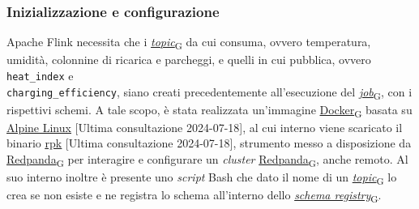 \subsubsection{Inizializzazione e configurazione}
Apache Flink necessita che i \href{https://7last.github.io/docs/pb/documentazione-interna/glossario\#topic}{\textit{topic}\textsubscript{G}} da cui consuma, ovvero temperatura, umidità, colonnine di ricarica e parcheggi, e quelli in cui pubblica, ovvero \texttt{heat\_index} e \\\texttt{charging\_efficiency},
siano creati precedentemente all'esecuzione del \href{https://7last.github.io/docs/pb/documentazione-interna/glossario\#job}{\textit{job}\textsubscript{G}}, con i rispettivi schemi. A tale scopo, è stata realizzata un'immagine \href{https://7last.github.io/docs/pb/documentazione-interna/glossario\#docker}{Docker\textsubscript{G}} basata su \href{https://hub.docker.com/_/alpine}{\underline{Alpine Linux}} [Ultima consultazione 2024-07-18],
al cui interno viene scaricato il binario \href{https://docs.redpanda.com/current/get-started/intro-to-rpk/}{\underline{rpk}} [Ultima consultazione 2024-07-18], strumento
messo a disposizione da \href{https://7last.github.io/docs/pb/documentazione-interna/glossario\#redpanda}{Redpanda\textsubscript{G}} per interagire e configurare un \textit{cluster} \href{https://7last.github.io/docs/pb/documentazione-interna/glossario\#redpanda}{Redpanda\textsubscript{G}}, anche remoto. Al suo interno inoltre è presente uno \textit{script} Bash che
dato il nome di un \href{https://7last.github.io/docs/pb/documentazione-interna/glossario\#topic}{\textit{topic}\textsubscript{G}} lo crea se non esiste e ne registra lo schema all'interno dello \href{https://7last.github.io/docs/pb/documentazione-interna/glossario\#schema-registry}{\textit{schema registry}\textsubscript{G}}.

